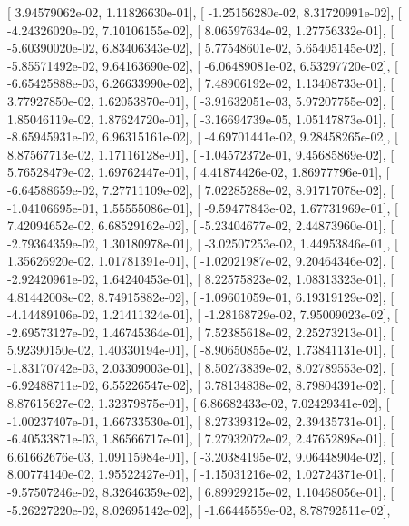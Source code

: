\documentclass{article}
\begin{document}
       [  3.94579062e-02,   1.11826630e-01],
       [ -1.25156280e-02,   8.31720991e-02],
       [ -4.24326020e-02,   7.10106155e-02],
       [  8.06597634e-02,   1.27756332e-01],
       [ -5.60390020e-02,   6.83406343e-02],
       [  5.77548601e-02,   5.65405145e-02],
       [ -5.85571492e-02,   9.64163690e-02],
       [ -6.06489081e-02,   6.53297720e-02],
       [ -6.65425888e-03,   6.26633990e-02],
       [  7.48906192e-02,   1.13408733e-01],
       [  3.77927850e-02,   1.62053870e-01],
       [ -3.91632051e-03,   5.97207755e-02],
       [  1.85046119e-02,   1.87624720e-01],
       [ -3.16694739e-05,   1.05147873e-01],
       [ -8.65945931e-02,   6.96315161e-02],
       [ -4.69701441e-02,   9.28458265e-02],
       [  8.87567713e-02,   1.17116128e-01],
       [ -1.04572372e-01,   9.45685869e-02],
       [  5.76528479e-02,   1.69762447e-01],
       [  4.41874426e-02,   1.86977796e-01],
       [ -6.64588659e-02,   7.27711109e-02],
       [  7.02285288e-02,   8.91717078e-02],
       [ -1.04106695e-01,   1.55555086e-01],
       [ -9.59477843e-02,   1.67731969e-01],
       [  7.42094652e-02,   6.68529162e-02],
       [ -5.23404677e-02,   2.44873960e-01],
       [ -2.79364359e-02,   1.30180978e-01],
       [ -3.02507253e-02,   1.44953846e-01],
       [  1.35626920e-02,   1.01781391e-01],
       [ -1.02021987e-02,   9.20464346e-02],
       [ -2.92420961e-02,   1.64240453e-01],
       [  8.22575823e-02,   1.08313323e-01],
       [  4.81442008e-02,   8.74915882e-02],
       [ -1.09601059e-01,   6.19319129e-02],
       [ -4.14489106e-02,   1.21411324e-01],
       [ -1.28168729e-02,   7.95009023e-02],
       [ -2.69573127e-02,   1.46745364e-01],
       [  7.52385618e-02,   2.25273213e-01],
       [  5.92390150e-02,   1.40330194e-01],
       [ -8.90650855e-02,   1.73841131e-01],
       [ -1.83170742e-03,   2.03309003e-01],
       [  8.50273839e-02,   8.02789553e-02],
       [ -6.92488711e-02,   6.55226547e-02],
       [  3.78134838e-02,   8.79804391e-02],
       [  8.87615627e-02,   1.32379875e-01],
       [  6.86682433e-02,   7.02429341e-02],
       [ -1.00237407e-01,   1.66733530e-01],
       [  8.27339312e-02,   2.39435731e-01],
       [ -6.40533871e-03,   1.86566717e-01],
       [  7.27932072e-02,   2.47652898e-01],
       [  6.61662676e-03,   1.09115984e-01],
       [ -3.20384195e-02,   9.06448904e-02],
       [  8.00774140e-02,   1.95522427e-01],
       [ -1.15031216e-02,   1.02724371e-01],
       [ -9.57507246e-02,   8.32646359e-02],
       [  6.89929215e-02,   1.10468056e-01],
       [ -5.26227220e-02,   8.02695142e-02],
       [ -1.66445559e-02,   8.78792511e-02],
\end{document}
